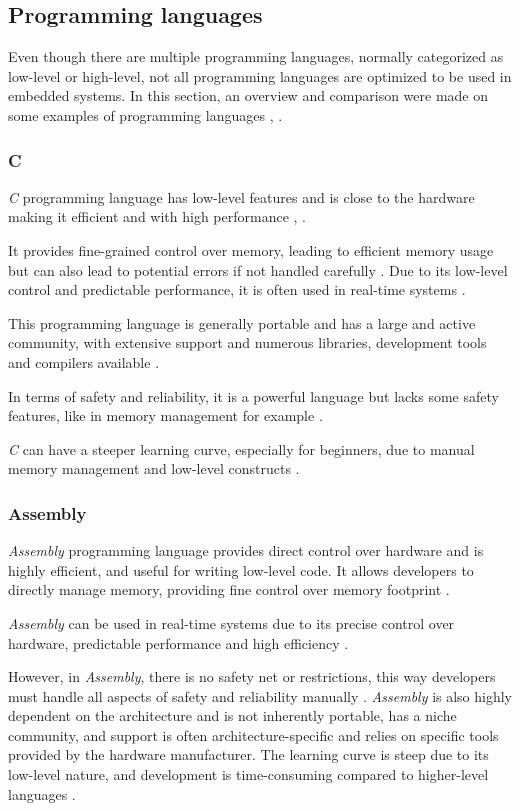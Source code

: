 \subsection{Programming languages}
Even though there are multiple programming languages, normally categorized as low-level or high-level, not all programming languages are optimized to be used in embedded systems.
In this section, an overview and comparison were made on some examples of programming languages \cite{LPROG4}, \cite{LPROG6}.

\subsubsection{C}
\textit{C} programming language has low-level features and is close to the hardware making it efficient and with high performance \cite{LPROG2}, \cite{LPROG6}.

It provides fine-grained control over memory, leading to efficient memory usage but can also lead to potential errors if not handled carefully \cite{LPROG5}.
Due to its low-level control and predictable performance, it is often used in real-time systems \cite{LPROG7}.

This programming language is generally portable and has a large and active community, with extensive support and numerous libraries, development tools and compilers available \cite{LPROG7}.

In terms of safety and reliability, it is a powerful language but lacks some safety features, like in memory management for example \cite{LPROG7}.

\textit{C} can have a steeper learning curve, especially for beginners, due to manual memory management and low-level constructs \cite{LPROG2}.

\subsubsection{Assembly}
\textit{Assembly} programming language provides direct control over hardware and is highly efficient, and useful for writing low-level code.
It allows developers to directly manage memory, providing fine control over memory footprint \cite{LPROG7}.

\textit{Assembly} can be used in real-time systems due to its precise control over hardware, predictable performance and high efficiency \cite{LPROG5}.

However, in \textit{Assembly}, there is no safety net or restrictions, this way developers must handle all aspects of safety and reliability manually \cite{LPROG7}.
\textit{Assembly} is also highly dependent on the architecture and is not inherently portable, has a niche community, and support is often architecture-specific and relies on specific tools provided by the hardware manufacturer.
The learning curve is steep due to its low-level nature, and development is time-consuming compared to higher-level languages \cite{LPROG5}.

